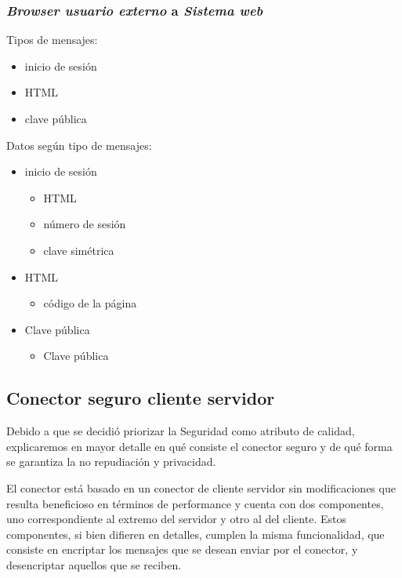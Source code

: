 \subsubsection{\emph{Browser usuario externo} a \emph{Sistema web}}


Tipos de mensajes:
\begin{itemize}
 \item inicio de sesión
 \item HTML
 \item clave pública
\end{itemize}


Datos según tipo de mensajes:
\begin{itemize}
 \item inicio de sesión
 \begin{itemize}
  \item HTML
  \item número de sesión
  \item clave simétrica
 \end{itemize}
 \item HTML
  \begin{itemize}
   \item código de la página
  \end{itemize}

 \item Clave pública
  \begin{itemize}
   \item Clave pública
  \end{itemize}
\end{itemize}


\subsection{Conector seguro cliente servidor}

Debido a que se decidió priorizar la Seguridad como atributo de calidad, explicaremos en mayor detalle en qué consiste el conector seguro y de qué forma se garantiza la no repudiación y privacidad.

El conector está basado en un conector de cliente servidor sin modificaciones que resulta beneficioso en términos de performance y cuenta con dos componentes, uno correspondiente al extremo del servidor y otro al del cliente. 
Estos componentes, si bien difieren en detalles, cumplen la misma funcionalidad, que consiste en encriptar los mensajes que se desean enviar por el conector, y desencriptar aquellos que se reciben.


